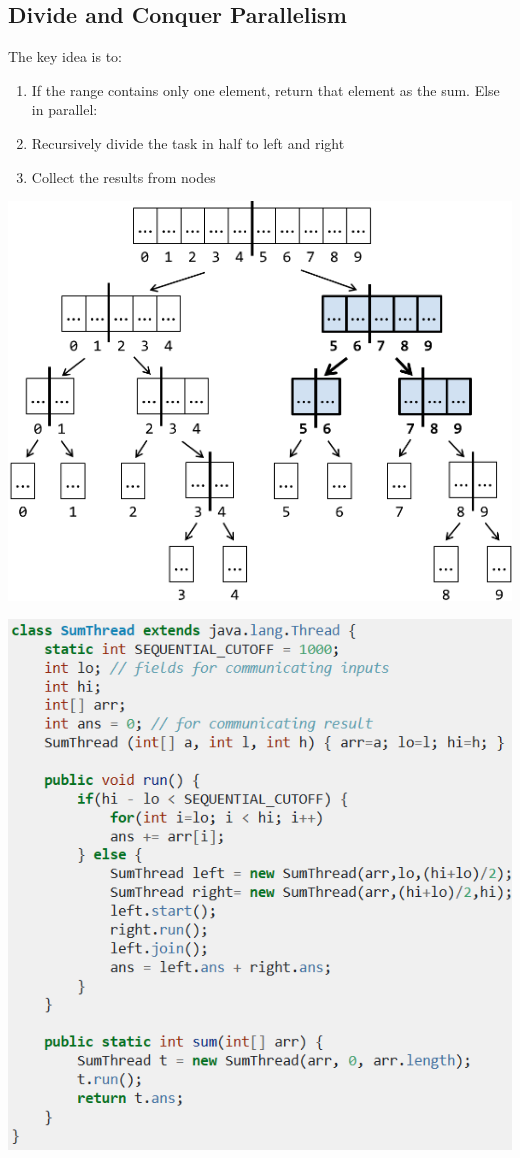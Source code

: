 \documentclass[letterpaper,12pt]{article}
\begin{document}
\subsection{Divide and Conquer Parallelism}
The key idea is to:
\begin{enumerate}
      \item If the range contains only one element, return that element as the sum. Else in parallel:
      \item Recursively divide the task in half to left and right
      \item Collect the results from nodes
\end{enumerate}

\includegraphics*{summary_image/Divide and Conequer Parallelism.png}

\includegraphics*{summary_image/Divide and Conequer algorithm}
\end{document}
